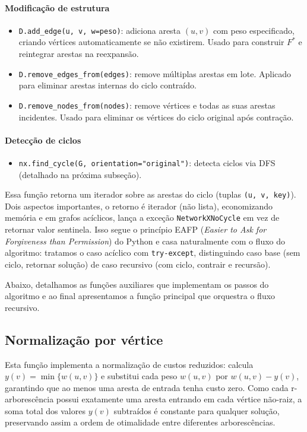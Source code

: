 \paragraph*{Modificação de estrutura}
\begin{itemize}\setlength{\itemsep}{2pt}
    \item \texttt{D.add\_edge(u, v, w=peso)}: adiciona aresta \((u,v)\) com peso especificado, criando vértices automaticamente se não existirem. Usado para construir \(F^*\) e reintegrar arestas na reexpansão.
    \item \texttt{D.remove\_edges\_from(edges)}: remove múltiplas arestas em lote. Aplicado para eliminar arestas internas do ciclo contraído.
    \item \texttt{D.remove\_nodes\_from(nodes)}: remove vértices e todas as suas arestas incidentes. Usado para eliminar os vértices do ciclo original após contração.
\end{itemize}

\paragraph*{Detecção de ciclos}
\begin{itemize}\setlength{\itemsep}{2pt}
    \item \texttt{nx.find\_cycle(G, orientation="original")}: detecta ciclos via DFS (detalhado na próxima subseção).
\end{itemize}

Essa função retorna um iterador sobre as arestas do ciclo (tuplas \texttt{(u, v, key)}). Dois aspectos importantes, o retorno é iterador (não lista), economizando memória e em grafos acíclicos, lança a exceção \texttt{NetworkXNoCycle} em vez de retornar valor sentinela. Isso segue o princípio EAFP (\emph{Easier to Ask for Forgiveness than Permission}) do Python e casa naturalmente com o fluxo do algoritmo: tratamos o caso acíclico com \texttt{try-except}, distinguindo caso base (sem ciclo, retornar solução) de caso recursivo (com ciclo, contrair e recursão).

Abaixo, detalhamos as funções auxiliares que implementam os passos do algoritmo e ao final apresentamos a função principal que orquestra o fluxo recursivo.

\subsection{Normalização por vértice}

Esta função implementa a normalização de custos reduzidos: calcula \(y(v)=\min\{w(u,v)\}\) e substitui cada peso \(w(u,v)\) por \(w(u,v)-y(v)\), garantindo que ao menos uma aresta de entrada tenha custo zero. Como cada r-arborescência possui exatamente uma aresta entrando em cada vértice não-raiz, a soma total dos valores \(y(v)\) subtraídos é constante para qualquer solução, preservando assim a ordem de otimalidade entre diferentes arborescências.

